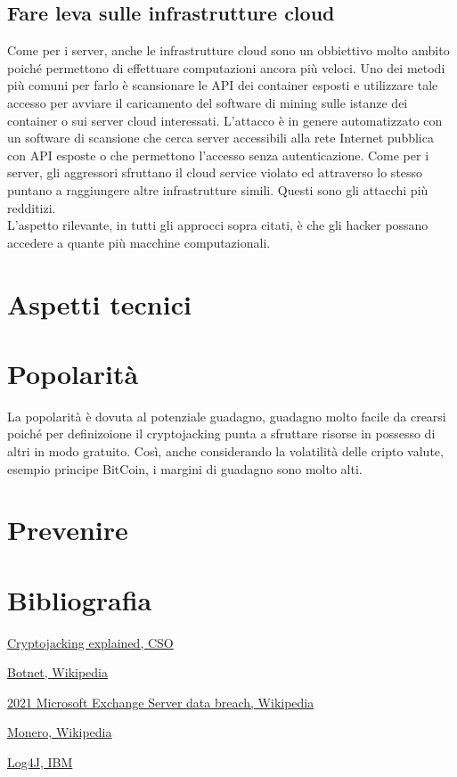 \documentclass[12pt,a4paper]{article}
\begin{document}
\subsection{Fare leva sulle infrastrutture cloud}
Come per i server, anche le infrastrutture cloud sono un obbiettivo molto ambito
poiché permettono di effettuare computazioni ancora più veloci. Uno dei metodi
più comuni per farlo è scansionare le API dei container esposti e utilizzare
tale accesso per avviare il caricamento del software di mining sulle istanze dei
container o sui server cloud interessati. L'attacco è in genere automatizzato
con un software di scansione che cerca server accessibili alla rete Internet
pubblica con API esposte o che permettono l'accesso senza autenticazione. Come
per i server, gli aggressori sfruttano il cloud service violato ed attraverso lo
stesso puntano a raggiungere altre infrastrutture simili.
Questi sono gli attacchi più redditizi.
\\
L'aspetto rilevante, in tutti gli approcci sopra citati, è che gli hacker possano 
accedere a quante più macchine computazionali.

\section{Aspetti tecnici}

\section{Popolarità}
La popolarità è dovuta al potenziale guadagno, guadagno molto facile da crearsi
poiché per definizoione il cryptojacking punta a sfruttare risorse in possesso
di altri in modo gratuito. Così, anche considerando la volatilità delle cripto
valute, esempio principe BitCoin, i margini di guadagno sono molto alti.

\section{Prevenire}

\section{Bibliografia}
\begin{thebibliography}{9}

\href{https://arc.net/l/quote/karbftmg}{Cryptojacking explained, CSO}

\href{https://arc.net/l/quote/ftyxgxms}{Botnet, Wikipedia}

\href{https://arc.net/l/quote/golshtco}{2021 Microsoft Exchange Server data breach, Wikipedia}

\href{https://arc.net/l/quote/jffmkeln}{Monero, Wikipedia}

\href{https://arc.net/l/quote/zjujxamu}{Log4J, IBM}


\end{thebibliography}
\end{document}
